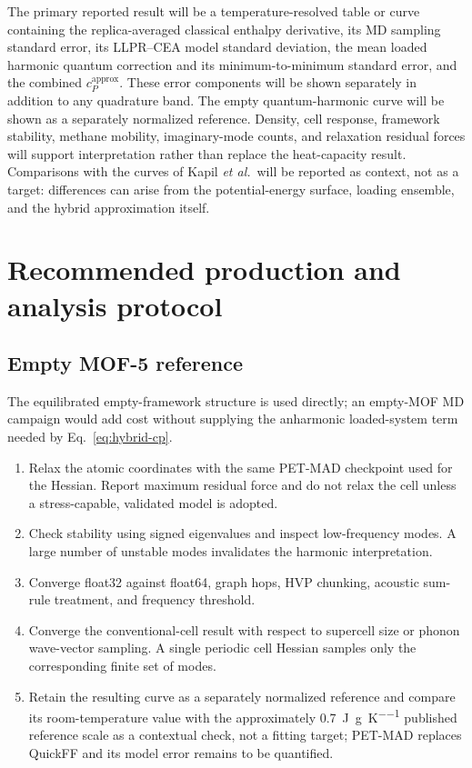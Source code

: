 \documentclass[10pt,a4paper,twocolumn]{article}
\begin{document}
The primary reported result will be a temperature-resolved table or curve
containing the replica-averaged classical enthalpy derivative, its MD sampling
standard error, its LLPR--CEA model standard deviation, the mean loaded
harmonic quantum correction and its minimum-to-minimum standard error, and the
combined $c_P^{\mathrm{approx}}$. These error components will be shown
separately in addition to any quadrature band. The empty quantum-harmonic curve
will be shown as a separately normalized reference. Density, cell response,
framework stability, methane mobility, imaginary-mode counts, and relaxation
residual forces will support interpretation rather than replace the
heat-capacity result.
Comparisons with the curves of Kapil \emph{et al.}\ will be reported as
context, not as a target: differences can arise from the potential-energy
surface, loading ensemble, and the hybrid approximation itself.

\section{Recommended production and analysis protocol}

\subsection{Empty MOF-5 reference}

The equilibrated empty-framework structure is used directly; an empty-MOF MD
campaign would add cost without supplying the anharmonic loaded-system term
needed by Eq.~\eqref{eq:hybrid-cp}.

\begin{enumerate}
  \item Relax the atomic coordinates with the same PET-MAD checkpoint used for
        the Hessian. Report maximum residual force and do not relax the cell
        unless a stress-capable, validated model is adopted.
  \item Check stability using signed eigenvalues and inspect low-frequency
        modes. A large number of unstable modes invalidates the harmonic
        interpretation.
  \item Converge float32 against float64, graph hops, HVP chunking, acoustic
        sum-rule treatment, and frequency threshold.
  \item Converge the conventional-cell result with respect to supercell size or
        phonon wave-vector sampling. A single periodic cell Hessian samples
        only the corresponding finite set of modes.
  \item Retain the resulting curve as a separately normalized reference and
        compare its room-temperature value with the approximately
        \SI{0.7}{J\per g\per K} published reference scale as a contextual
        check, not a fitting target; PET-MAD replaces QuickFF and its model
        error remains to be quantified.
\end{enumerate}
\end{document}
